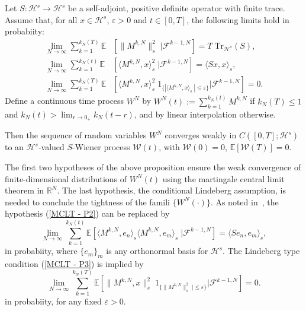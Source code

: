 \begin{proposition}\autocite[Theorem 5.1]{Berger1986}
\label{Martingale central limit theorem - Helping proposition}
  Let $ S : \mathcal{H}^s \to \mathcal{H}^s $ be a self-adjoint, positive definite operator with finite trace. Assume that, for all $ x \in \mathcal{H}^s $, $ \varepsilon > 0 $ and $ t \in [0,T] $, the following limits hold in probabiity:
  \begin{align}
   \lim_{N \to \infty} \sum_{k=1}^{k_{N}(T)} \mathbb{E} &\left[ \| M^{k,N} \|_{s}^{2}  \; | \mathcal{F}^{k-1,N} \right] = T \; \text{Tr}_{\mathcal{H}^s}(S), \label{MCLT - P1}\\
   \lim_{N \to \infty} \sum_{k=1}^{k_{N}(t)} \mathbb{E} &\left[ \langle  M^{k,N} , x \rangle_{s}^{2}  \; | \mathcal{F}^{k-1,N} \right] = \langle Sx , x \rangle_{s}, \label{MCLT - P2}\\
   \lim_{N \to \infty} \sum_{k=1}^{k_{N}(T)} \mathbb{E} &\left[ \langle M^{k,N} , x \rangle_{s}^{2} \; 1_{\{ | \langle M^{k,N} , x \rangle_s \; | \leq \varepsilon \}} | \mathcal{F}^{k-1,N} \right] = 0. \label{MCLT - P3}
  \end{align}
  Define a continuous time process $ W^{N} $ by $ W^{N}(t) := \sum_{k=1}^{k_{N}(t)} M^{k,N} $ if $ k_{N}(T) \leq 1 $ and $ k_{N}(t) > \lim_{r \to 0_+} k_N(t-r) $, and by linear interpolation otherwise.
  
  Then the sequence of random variables $ W^N $ converges weakly in $ C \left( [0,T]; \mathcal{H}^s \right) $ to an $ \mathcal{H}^s $-valued $S$-Wiener process $\mathcal{W}(t)$, with $ \mathcal{W}(0) = 0 $, $ \mathbb{E} [ \mathcal{W}(T) ] =  0 $.
  
\end{proposition}

\begin{rem}
The first two hypotheses of the above proposition ensure the weak convergence of finite-dimensional distributions of $ W^{N}(t) $ using the martingale central limit theorem in $ \mathbb{R}^N $. The last hypothesis, the conditional Lindeberg assumption, is needed to conclude the tightness of the famili $ \{ W^{N}(\cdot) \}  $. As noted in~\autocite{ChenWhite1998}, the hypothesis (\ref{MCLT - P2}) can be replaced by
 \begin{equation}
  \lim_{N \to \infty} \sum_{k=1}^{k_{N}(t)} \mathbb{E} \left[ \langle  M^{k,N} , e_n \rangle_{s} \langle  M^{k,N} , e_m \rangle_{s} \; | \mathcal{F}^{k-1,N} \right] = \langle Se_n , e_m \rangle_{s}, \label{MCLT - P2 - new}
 \end{equation}
 in probabiity, where $ \{ e_m \}_{m} $ is any orthonormal basis for $ \mathcal{H}^s $. The Lindeberg type condition (\ref{MCLT - P3}) is implied by
 \begin{equation}
  \lim_{N \to \infty} \sum_{k=1}^{k_{N}(T)} \mathbb{E} \left[ \| M^{k,N} , x \|_{s}^{2} \;  1_{\{ \| M^{k,N} \|_{s}^{2} \; | \leq \varepsilon \}} | \mathcal{F}^{k-1,N} \right] = 0. \label{MCLT - P3 - new}
 \end{equation}
 in probabiity, for any fixed $ \varepsilon > 0 $.

\end{rem}

